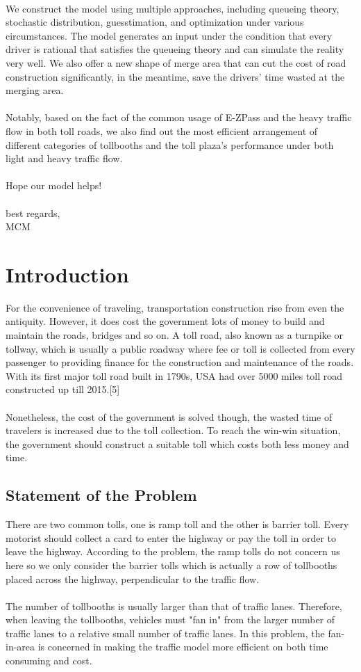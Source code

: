 \\
We construct the model using multiple approaches, including queueing theory, stochastic distribution, guesstimation, and optimization under various circumstances. The model generates an input under the condition that every driver is rational that satisfies the queueing theory and can simulate the reality very well. We also offer a new shape of merge area that can cut the cost of road construction significantly, in the meantime, save the drivers' time wasted at the merging area.\\
\\
Notably, based on the fact of the common usage of E-ZPass and the heavy traffic flow in both toll roads, we also find out the most efficient arrangement of different categories of tollbooths and the toll plaza's performance under both light and heavy traffic flow.\\
\\
Hope our model helps!\\
\\
\noindent
best regards,\\
MCM

\section{Introduction}
For the convenience of traveling, transportation construction rise from even the antiquity. However, it does cost the government lots of money to build and maintain the roads, bridges and so on. A toll road, also known as a turnpike or tollway, which is usually a public roadway where fee or toll is collected from every passenger to providing finance for the construction and maintenance of the roads. With its first major toll road built in 1790s, USA had over 5000 miles toll road constructed up till 2015.[5]\\
\\
Nonetheless, the cost of the government is solved though, the wasted time of travelers is increased due to the toll collection. To reach the win-win situation, the government should construct a suitable toll which costs both less money and time.

\subsection{Statement of the Problem}
There are two common tolls, one is ramp toll and the other is barrier toll. Every motorist should collect a card to enter the highway or pay the toll in order to leave the highway. According to the problem, the ramp tolls do not concern us here so we only consider the barrier tolls which is actually a row of tollbooths placed across the highway, perpendicular to the traffic flow.\\
\\
The number of tollbooths is usually larger than that of traffic lanes. Therefore, when leaving the tollbooths, vehicles must "fan in" from the larger number of traffic lanes to a relative small number of traffic lanes. In this problem, the fan-in-area is concerned in making the traffic model more efficient on both time consuming and cost.

